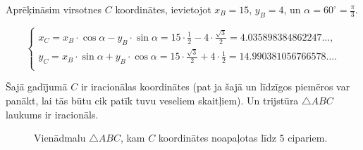 \documentclass[a4paper,12pt]{article}
\begin{document}
Aprēķināsim virsotnes $C$ koordinātes, ievietojot $x_B = 15$, $y_B = 4$, un $\alpha = 60^{\circ} = \frac{\pi}{3}$. 

\[ \left\{ \begin{array}{l}
x_C = x_B \cdot \cos \alpha - y_B \cdot \sin \alpha = 15 \cdot \frac{1}{2} - 4 \cdot \frac{\sqrt{3}}{2} = 4.035898384862247\ldots{}, \\
y_C = x_B \cdot \sin \alpha + y_B \cdot \cos \alpha = 15 \cdot \frac{\sqrt{3}}{2} + 4 \cdot \frac{1}{2} = 14.990381056766578\ldots{}. \\
\end{array} \right.
\]

Šajā gadījumā $C$ ir iracionālas koordinātes (pat ja šajā un līdzīgos piemēros var panākt, lai tās būtu cik patīk tuvu veseliem skaitļiem). 
Un trijstūra $\bigtriangleup{}ABC$ laukums ir iracionāls. 


\begin{figure}[!htb]
\caption{\label{fig:approximate-triangle} Vienādmalu $\bigtriangleup{}ABC$, kam  $C$ koordinātes noapaļotas līdz $5$ cipariem.}
\end{figure}
\end{document}
